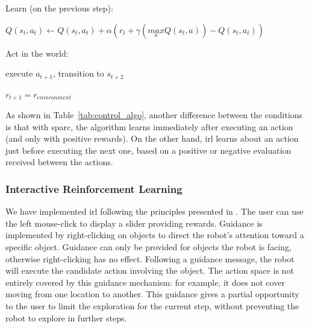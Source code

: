\begin{table}
\begin{minipage}[t]{0.5\textwidth}
\begin{algorithm}[H]
\begin{minipage}{0.9\linewidth}
{			
		
		\nosemic Learn (on the previous step):
		 
		\pushline\dosemic$Q(s_{t},a_{t}) \leftarrow Q(s_{t},a_{t}) + \alpha (r_{t}+\gamma (\underset{a}{max} Q(s_{t},a))-Q(s_{t},a_{t}))$
		
		\popline \nosemic Act in the world:
		
		\pushline\dosemic execute $a_{t+1}$, transition to $s_{t+2}$
		
		\popline$r_{t+1} = r_{environment}$
	}
	\end{minipage}
	\end{algorithm}
\end{minipage}
\label{tab:control_algo}
\end{table}

As shown in Table~\ref{tab:control_algo}, another difference between the conditions is that with \gls{sparc}, the algorithm learns immediately after executing an action (and only with positive rewards). On the other hand, \gls{irl} learns about an action just before executing the next one, based on a positive or negative evaluation received between the actions.

\subsubsection{Interactive Reinforcement Learning}

We have implemented \gls{irl} following the principles presented in \cite{thomaz2008teachable}. The user can use the left mouse-click to display a slider providing rewards. Guidance is implemented by right-clicking on objects to direct the robot's attention toward a specific object. Guidance can only be provided for objects the robot is facing, otherwise right-clicking has no effect. Following a guidance message, the robot will execute the candidate action involving the object. The action space is not entirely covered by this guidance mechanism: for example, it does not cover moving from one location to another. This guidance gives a partial opportunity to the user to limit the exploration for the current step, without preventing the robot to explore in further steps.


